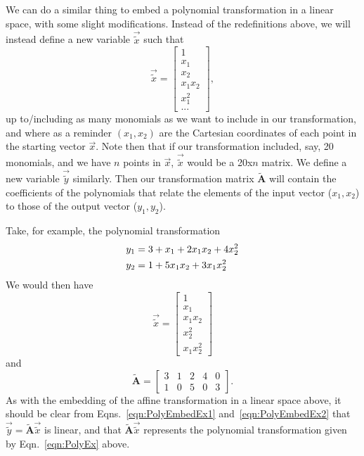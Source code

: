 \documentclass[11pt]{article}
\begin{document}
We can do a similar thing to embed a polynomial transformation in a linear space, with some slight modifications. Instead of the redefinitions above, we will instead define a new variable $\vec{\widetilde{x}}$ such that 
\begin{equation}
\vec{\widetilde{x}} = \left[\begin{matrix} 1 \\
							   x_1\\
							   x_2\\
							   x_1x_2 \\
							   x_1^2\\
							    ... \end{matrix} \right],
\end{equation}
up to/including as many monomials as we want to include in our transformation, and where as a reminder $(x_1,x_2)$ are the Cartesian coordinates of each point in the starting vector $\vec{x}$.  Note then that if our transformation included, say, 20 monomials, and we have $n$ points in $\vec{x}$, $\vec{\widetilde{x}}$ would be a 20x$n$ matrix.  We define a new variable $\vec{\widetilde{y}}$ similarly. Then our transformation matrix $\mathbf{\widetilde{A}}$ will contain the coefficients of the polynomials that relate the elements of the input vector ($x_1,x_2$) to those of the output vector ($y_1,y_2$). 

Take, for example, the polynomial transformation 
\begin{align}\label{eqn:PolyEx}
      y_1 &=  3+x_1+2x_1x_2+4x_2^2\\\notag
      y_2 &= 1+5x_1x_2+ 3x_1x_2^2 
\end{align}
We would then have 
\begin{equation}
\vec{\widetilde{x}} = \left[\begin{matrix} 1 \\
							   x_1\\
							   x_1x_2\\
							   x_2^2\\
							   x_1x_2^2\end{matrix} \right] \label{eqn:PolyEmbedEx1}
\end{equation}
and
\begin{equation}
\mathbf{\widetilde{A}} = \left[ \begin{matrix} 3 & 1 & 2 & 4 & 0\\
						1 & 0 & 5 & 0 & 3 \end{matrix} \right]. \label{eqn:PolyEmbedEx2}
\end{equation}
As with the embedding of the affine transformation in a linear space above, it should be clear from Eqns.~\eqref{eqn:PolyEmbedEx1} and~\eqref{eqn:PolyEmbedEx2} that $\vec{\widetilde{y}} = \mathbf{\widetilde{A}}\vec{\widetilde{x}}$ is linear, and that $\mathbf{\widetilde{A}}\vec{\widetilde{x}}$ represents the polynomial transformation given by Eqn.~\eqref{eqn:PolyEx} above.  
\end{document}
